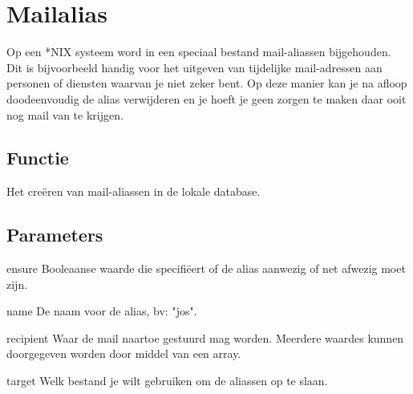 \section{Mailalias}
Op een *NIX systeem word in een speciaal bestand mail-aliassen bijgehouden. Dit is bijvoorbeeld handig voor het uitgeven van tijdelijke mail-adressen aan personen of diensten waarvan je niet zeker bent. Op deze manier kan je na afloop doodeenvoudig de alias verwijderen en je hoeft je geen zorgen te maken daar ooit nog mail van te krijgen.

\subsection{Functie}
Het cre\"{e}ren van mail-aliassen in de lokale database.

\subsection{Parameters}
ensure
Booleaanse waarde die specifi\"{e}ert of de alias aanwezig of net afwezig moet zijn.

name
De naam voor de alias, bv: "jos".

recipient
Waar de mail naartoe gestuurd mag worden. Meerdere waardes kunnen doorgegeven worden door middel van een array.

target
Welk bestand je wilt gebruiken om de aliassen op te slaan.
